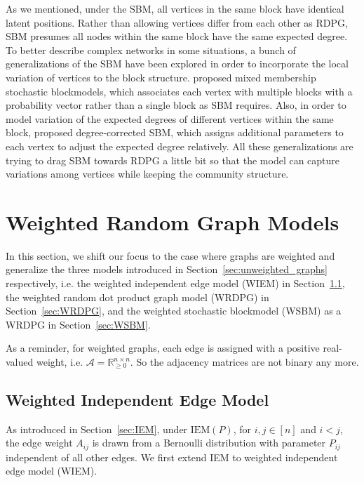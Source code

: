 \begin{remark}
\label{remark:other_models}
As we mentioned, under the SBM, all vertices in the same block have identical latent positions. Rather than allowing vertices differ from each other as RDPG, SBM presumes all nodes within the same block have the same expected degree. To better describe complex networks in some situations, a bunch of generalizations of the SBM have been explored in order to incorporate the local variation of vertices to the block structure. \citet{airoldi2008mixed} proposed mixed membership stochastic blockmodels, which associates each vertex with multiple blocks with a probability vector rather than a single block as SBM requires. Also, in order to model variation of the expected degrees of different vertices within the same block, \citet{karrer2011stochastic} proposed degree-corrected SBM, which assigns additional parameters to each vertex to adjust the expected degree relatively. All these generalizations are trying to drag SBM towards RDPG a little bit so that the model can capture variations among vertices while keeping the community structure.
\end{remark}




\section{Weighted Random Graph Models}
\label{sec:weighted_graphs}

In this section, we shift our focus to the case where graphs are weighted and generalize the three models introduced in Section~\ref{sec:unweighted_graphs} respectively, i.e. the weighted independent edge model (WIEM) in Section~\ref{sec:WIEM}, the weighted random dot product graph model (WRDPG) in Section~\ref{sec:WRDPG}, and the weighted stochastic blockmodel (WSBM) as a WRDPG in Section~\ref{sec:WSBM}.

As a reminder, for weighted graphs, each edge is assigned with a positive real-valued weight, i.e. $\mathcal{A} = \mathbb{R}^{n \times n}_{\ge 0}$. So the adjacency matrices are not binary any more.


\subsection{Weighted Independent Edge Model}
\label{sec:WIEM}

As introduced in Section~\ref{sec:IEM}, under $\mathrm{IEM}(P)$, for $i, j \in [n]$ and $i < j$, the edge weight $A_{ij}$ is drawn from a Bernoulli distribution with parameter $P_{ij}$ independent of all other edges.
We first extend IEM to weighted independent edge model (WIEM).

